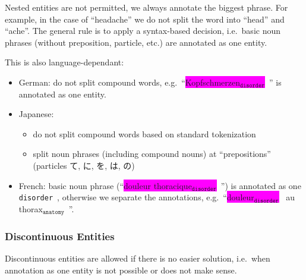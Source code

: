 \documentclass[12pt]{article}
\theoremstyle{definition}
\newcommand{\anatomy}[1]{\colorbox{dollarbill}{#1$_{\texttt{anatomy}}$}\ }
\newcommand{\disorder}[1]{\colorbox{fuchsia}{#1$_{\texttt{disorder}}$}\ }
\newcommand{\dis}{\texttt{disorder}\ }
\begin{document}
Nested entities are not permitted, we always annotate the biggest phrase.
For example, in the case of ``headache'' we do not split the word into ``head'' and ``ache''. 
The general rule is to apply a syntax-based decision, i.e.~basic noun phrases (without preposition, particle, etc.) are annotated as one entity.

This is also language-dependant:
\begin{itemize}
    \item German: do not split compound words, e.g.~``\disorder{Kopfschmerzen}'' is annotated as one entity.
    \item Japanese: 
    \begin{itemize}
        \item do not split compound words based on standard tokenization
        \item split noun phrases (including compound nouns) at ``prepositions'' (particles て, に, を, は, の)
    \end{itemize}
    
    \item French: basic noun phrase (``\disorder{douleur thoracique}'') is annotated as one \dis, otherwise  we separate the annotations, e.g.~``\disorder{douleur} au \anatomy{thorax}''.
\end{itemize}


\subsubsection*{Discontinuous Entities}

Discontinuous entities are allowed if there is no easier solution, i.e.~when annotation as one entity is not possible or does not make sense.
\end{document}
